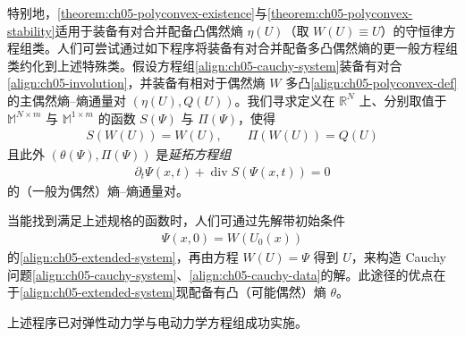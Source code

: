 \documentclass[../../main.tex]{subfiles}
\begin{document}
特别地，\cref{theorem:ch05-polyconvex-existence}与\cref{theorem:ch05-polyconvex-stability}适用于装备有对合并配备凸偶然熵 $\eta(U)$（取 $W(U)\equiv U$）的守恒律方程组类。人们可尝试通过如下程序将装备有对合并配备多凸偶然熵的更一般方程组类约化到上述特殊类。假设方程组\eqref{align:ch05-cauchy-system}装备有对合\eqref{align:ch05-involution}，并装备有相对于偶然熵 $W$ 多凸\eqref{align:ch05-polyconvex-def}的主偶然熵--熵通量对 $(\eta(U),Q(U))$。我们寻求定义在 $\mathbb{R}^{N}$ 上、分别取值于 $\mathbb{M}^{N\times m}$ 与 $\mathbb{M}^{1\times m}$ 的函数 $S(\Psi)$ 与 $\Pi(\Psi)$，使得
\begin{align}
S(W(U))=W(U),\qquad\Pi(W(U))=Q(U)\label{align:ch05-reduction}
\end{align}
且此外 $(\theta(\Psi),\Pi(\Psi))$ 是\emph{延拓方程组}
\begin{align}
\partial_{t}\Psi(x,t)+\operatorname{div}S(\Psi(x,t))=0\label{align:ch05-extended-system}
\end{align}
的（一般为偶然）熵--熵通量对。

当能找到满足上述规格的函数时，人们可通过先解带初始条件
\begin{align}
\Psi(x,0)=W(U_{0}(x))\label{align:ch05-extended-data}
\end{align}
的\eqref{align:ch05-extended-system}，再由方程 $W(U)=\Psi$ 得到 $U$，来构造 Cauchy 问题\eqref{align:ch05-cauchy-system}、\eqref{align:ch05-cauchy-data}的解。此途径的优点在于\eqref{align:ch05-extended-system}现配备有凸（可能偶然）熵 $\theta$。

上述程序已对弹性动力学与电动力学方程组成功实施。
\end{document}

